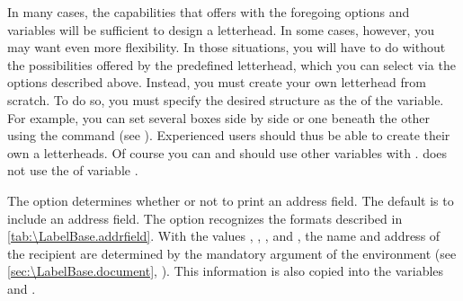 \begin{Declaration}
\end{Declaration}
In many cases, the capabilities that  offers with the
foregoing options and variables will be sufficient to design a letterhead. In
some cases, however, you may want even more flexibility. In those situations,
you will have to do without the possibilities offered by the predefined
letterhead, which you can select via the options described above. Instead, you
must create your own letterhead from scratch. To do so, you must specify the
desired structure as the  of the 
variable. For example, you can set several boxes side by side or one beneath
the other using the  command (see \cite{latex:usrguide}).
Experienced users should thus be able to create their own a letterheads. Of
course you can and should use other variables with
. \KOMAScript{} does not use the
 of variable . %
\EndIndexGroup


\begin{Declaration}
\end{Declaration}%
%
The  option determines whether or not to print an address
field. The default is to include an address field. The
option recognizes the formats described in
\autoref{tab:\LabelBase.addrfield}. With
the values ,
, , and , the name and
address of the recipient are determined by the mandatory argument of the
 environment (see
\autoref{sec:\LabelBase.document}, ). This
information is also copied into the variables  and
.

